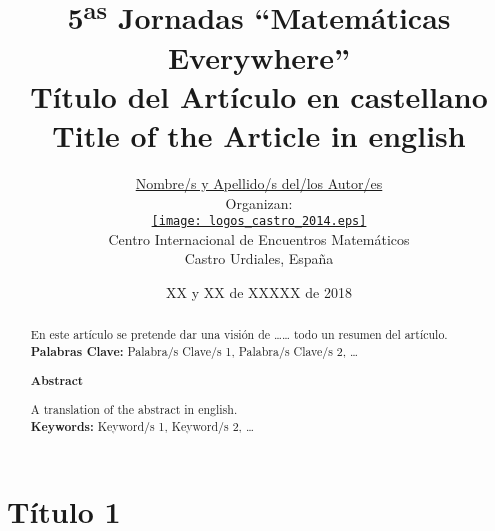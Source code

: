 \documentclass[a4paper,10pt,twoside]{article}
\begin{document}
\renewcommand{\tablename}{Tabla} 

\title{\vspace{-8mm}5\textsuperscript{as} Jornadas ``Matemáticas Everywhere''\\\vspace{4mm}
Título del Artículo en castellano\\\vspace{4mm}
Title of the Article in english\vspace{-3mm}}  %
\author{\href{mailto:mailautor@xxxx.es}{Nombre/s y Apellido/s del/los Autor/es}\\ \vspace{2mm} %
\scriptsize Organizan:\\
\small \href{http://www.caminos.upm.es/matematicas/jornadas2014/}{\texttt{[image: logos\_castro\_2014.eps]}}\\
\scriptsize Centro Internacional de Encuentros Matemáticos\vspace{-2mm}\\ 
\scriptsize Castro Urdiales, España} %
\date{XX y XX de XXXXX de 2018}
\maketitle

\begin{abstract}
En este artículo se pretende dar una visión de \dots{}\dots{} todo un resumen del artículo.\\
\newline
\noindent\textbf{Palabras Clave:} Palabra/s Clave/s 1, Palabra/s Clave/s 2, \dots{}
\newline
\begin{center}
 \textbf{Abstract}
\end{center}

\vspace{1.2mm}A translation of the abstract in english.\\
\newline
\noindent\textbf{Keywords:} Keyword/s 1, Keyword/s 2, \dots{}

\end{abstract}

\section{Título 1}
\end{document}
